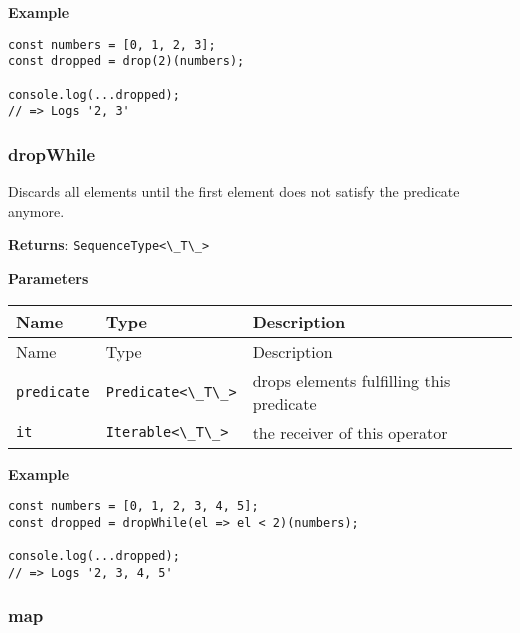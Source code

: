 \textbf{Example}

\begin{lstlisting}[label=30264928-f65c-4618-9003-3370ee05bb51]
const numbers = [0, 1, 2, 3];
const dropped = drop(2)(numbers);
                                 
console.log(...dropped);
// => Logs '2, 3'
\end{lstlisting}

\hypertarget{66ea1665-a0b4-4fa6-887f-aeb9507f83b2}{%
\subsubsection{dropWhile}\label{66ea1665-a0b4-4fa6-887f-aeb9507f83b2}}

Discards all elements until the first element does not satisfy the
predicate anymore.

\textbf{Returns}: \passthrough{\lstinline!SequenceType<\_T\_>!}

\textbf{Parameters}

\begin{longtable}[]{
  >{\raggedright\arraybackslash}p{}
  >{\raggedright\arraybackslash}p{}
  >{\raggedright\arraybackslash}p{}@{}}

\toprule\noalign{}
Name & Type & Description \\
\midrule\noalign{}
\endfirsthead
\toprule\noalign{}
Name & Type & Description \\
\midrule\noalign{}
\endhead
\bottomrule\noalign{}
\endlastfoot
\passthrough{\lstinline!predicate!} &
\passthrough{\lstinline!Predicate<\_T\_>!} & drops elements fulfilling
this predicate \\
\passthrough{\lstinline!it!} & \passthrough{\lstinline!Iterable<\_T\_>!}
& the receiver of this operator \\
\end{longtable}

\textbf{Example}

\begin{lstlisting}[label=6eda0eb3-c4be-4257-85f9-929d969986a0]
const numbers = [0, 1, 2, 3, 4, 5];
const dropped = dropWhile(el => el < 2)(numbers);
                                                 
console.log(...dropped);
// => Logs '2, 3, 4, 5'
\end{lstlisting}

\hypertarget{c353a5b1-74a9-4860-8859-5cb1db0001ed}{%
\subsubsection{map}\label{c353a5b1-74a9-4860-8859-5cb1db0001ed}}

